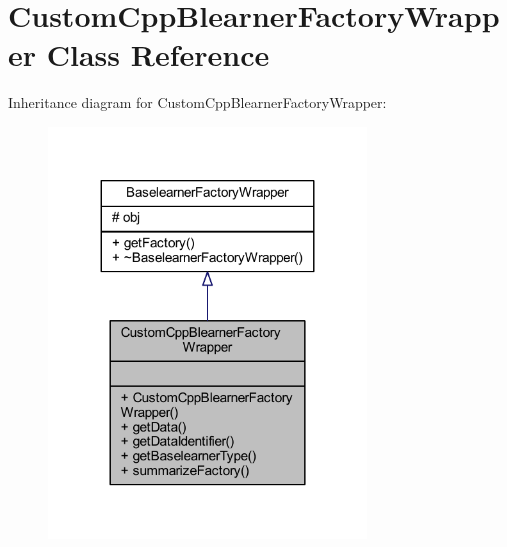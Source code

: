 \hypertarget{class_custom_cpp_blearner_factory_wrapper}{}\section{Custom\+Cpp\+Blearner\+Factory\+Wrapper Class Reference}
\label{class_custom_cpp_blearner_factory_wrapper}


Inheritance diagram for Custom\+Cpp\+Blearner\+Factory\+Wrapper\+:\nopagebreak
\begin{figure}[H]
\begin{center}
\leavevmode
\includegraphics[width=239pt]{class_custom_cpp_blearner_factory_wrapper__inherit__graph}
\end{center}
\end{figure}


